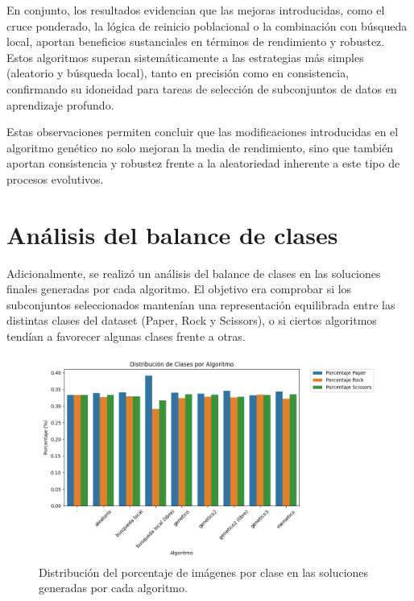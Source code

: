 En conjunto, los resultados evidencian que las mejoras introducidas, como el cruce ponderado, la lógica de reinicio poblacional
o la combinación con búsqueda local, aportan beneficios sustanciales en términos de rendimiento y robustez.
Estos algoritmos superan sistemáticamente a las estrategias más simples (aleatorio y búsqueda local), tanto en
precisión como en consistencia, confirmando su idoneidad para tareas de selección de subconjuntos de datos en aprendizaje profundo.


Estas observaciones permiten concluir que las modificaciones introducidas en el algoritmo genético no solo mejoran la media de rendimiento,
sino que también aportan consistencia y robustez frente a la aleatoriedad inherente a este tipo de procesos evolutivos.


\section{Análisis del balance de clases}\label{sec:analisis-del-balance-de-clases}
Adicionalmente, se realizó un análisis del balance de clases en las soluciones finales generadas por cada algoritmo.
El objetivo era comprobar si los subconjuntos seleccionados mantenían una representación equilibrada entre las
distintas clases del dataset (Paper, Rock y Scissors), o si ciertos algoritmos tendían a favorecer algunas clases frente a otras.


\begin{figure}[htp]
    \centering
    \includegraphics[width=1\textwidth]{imagenes/mobilenet-BARPLOT-balance-de-clases-por-algoritmo}
    \caption{Distribución del porcentaje de imágenes por clase en las soluciones generadas por cada algoritmo.}
    \label{fig:balance-de-clases-por-algoritmo}
\end{figure}

